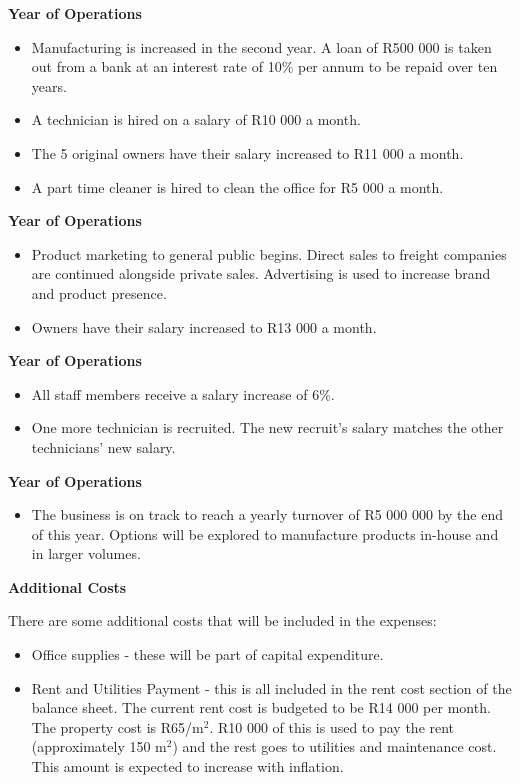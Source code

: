 {\bfseries {} Year of Operations}
\begin{itemize}
\item Manufacturing is increased in the second year. A loan of R500 000 is taken out from a bank at an interest rate of 10\% per annum to be repaid over ten years. 
\item A technician is hired on a salary of R10 000 a month.
\item The 5 original owners have their salary increased to R11 000 a month.
\item A part time cleaner is hired to clean the office for R5 000 a month.
\end{itemize}
\pagebreak
{\bfseries {} Year of Operations}
\begin{itemize}
\item Product marketing to general public begins. Direct sales to freight companies are continued alongside private sales. Advertising is used to increase brand and product presence.
\item Owners have their salary increased to R13 000 a month.
\end{itemize}

{\bfseries {} Year of Operations}
\begin{itemize}
\item All staff members receive a salary increase of 6\%.
\item One more technician is recruited. The new recruit's salary matches the other technicians' new salary.
\end{itemize}

{\bfseries {} Year of Operations}
\begin{itemize}
\item The business is on track to reach a yearly turnover of R5 000 000 by the end of this year. Options will be explored to manufacture products in-house and in larger volumes.
\end{itemize}

\vspace{18pt}
{\bfseries Additional Costs}

There are some additional costs that will be included in the expenses:
\begin{itemize}
\item Office supplies - these will be part of capital expenditure.
\item Rent and Utilities Payment - this is all included in the rent cost section of the balance sheet. The current rent cost is budgeted to be R14 000 per month. The property cost is R65/m$^2$. R10 000 of this is used to pay the rent (approximately 150 m$^2$) and the rest goes to utilities and maintenance cost. This amount is expected to increase with inflation. 
\end{itemize}


